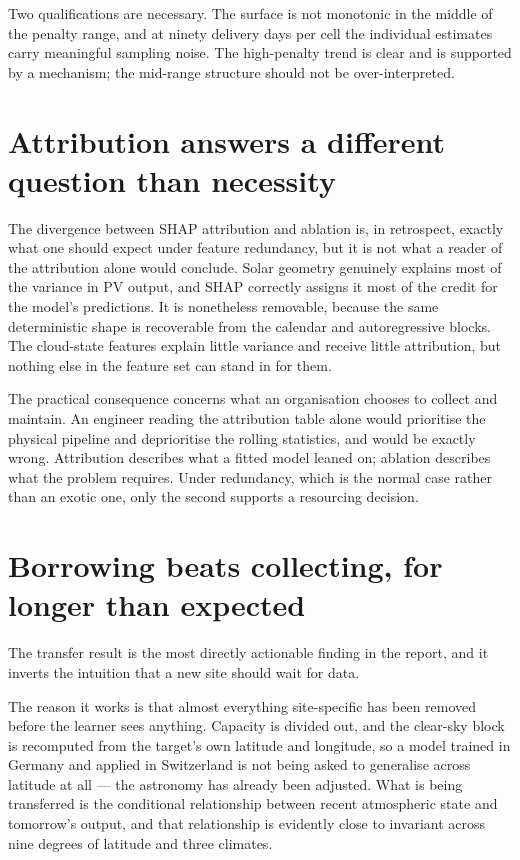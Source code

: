 \documentclass[11pt,a4paper,oneside]{report}
\begin{document}
Two qualifications are necessary. The surface is not monotonic in the middle of the penalty range, and at ninety delivery days per cell the individual estimates carry meaningful sampling noise. The high-penalty trend is clear and is supported by a mechanism; the mid-range structure should not be over-interpreted.

\section{Attribution answers a different question than necessity}

The divergence between SHAP attribution and ablation is, in retrospect, exactly what one should expect under feature redundancy, but it is not what a reader of the attribution alone would conclude. Solar geometry genuinely explains most of the variance in PV output, and SHAP correctly assigns it most of the credit for the model's predictions. It is nonetheless removable, because the same deterministic shape is recoverable from the calendar and autoregressive blocks. The cloud-state features explain little variance and receive little attribution, but nothing else in the feature set can stand in for them.

The practical consequence concerns what an organisation chooses to collect and maintain. An engineer reading the attribution table alone would prioritise the physical pipeline and deprioritise the rolling statistics, and would be exactly wrong. Attribution describes what a fitted model leaned on; ablation describes what the problem requires. Under redundancy, which is the normal case rather than an exotic one, only the second supports a resourcing decision.

\section{Borrowing beats collecting, for longer than expected}

The transfer result is the most directly actionable finding in the report, and it inverts the intuition that a new site should wait for data.

The reason it works is that almost everything site-specific has been removed before the learner sees anything. Capacity is divided out, and the clear-sky block is recomputed from the target's own latitude and longitude, so a model trained in Germany and applied in Switzerland is not being asked to generalise across latitude at all --- the astronomy has already been adjusted. What is being transferred is the conditional relationship between recent atmospheric state and tomorrow's output, and that relationship is evidently close to invariant across nine degrees of latitude and three climates.
\end{document}
